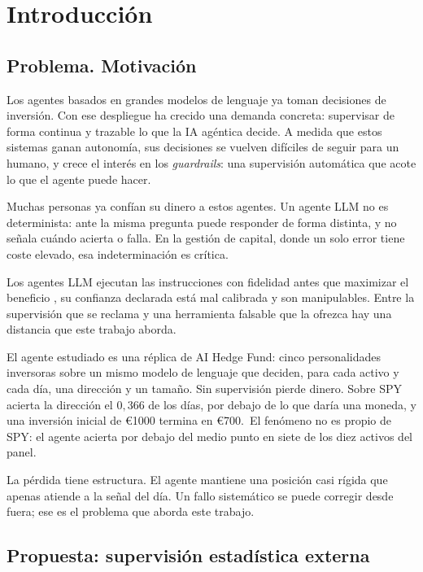 \chapter{Introducción}
\label{cap:introduccion}

\section{Problema. Motivación}
\label{sec:intro-motivacion}

Los agentes basados en grandes modelos de lenguaje ya toman decisiones de inversión. Con ese despliegue ha crecido una demanda concreta: supervisar de forma continua y trazable lo que la IA agéntica decide. A medida que estos sistemas ganan autonomía, sus decisiones se vuelven difíciles de seguir para un humano, y crece el interés en los \emph{guardrails}: una supervisión automática que acote lo que el agente puede hacer.

Muchas personas ya confían su dinero a estos agentes. Un agente LLM no es determinista: ante la misma pregunta puede responder de forma distinta, y no señala cuándo acierta o falla. En la gestión de capital, donde un solo error tiene coste elevado, esa indeterminación es crítica.

Los agentes LLM ejecutan las instrucciones con fidelidad antes que maximizar el beneficio \cite{lopezlira2025cantrade}, su confianza declarada está mal calibrada y son manipulables. Entre la supervisión que se reclama y una herramienta falsable que la ofrezca hay una distancia que este trabajo aborda.


El agente estudiado es una réplica de AI Hedge Fund: cinco personalidades inversoras sobre un mismo modelo de lenguaje que deciden, para cada activo y cada día, una dirección y un tamaño. Sin supervisión pierde dinero. Sobre SPY acierta la dirección el $0{,}366$ de los días, por debajo de lo que daría una moneda, y una inversión inicial de \euro{}1000 termina en \euro{}700.\,%
El fenómeno no es propio de SPY: el agente acierta por debajo del medio punto en siete de los diez activos del panel.\,%

La pérdida tiene estructura. El agente mantiene una posición casi rígida que apenas atiende a la señal del día. Un fallo sistemático se puede corregir desde fuera; ese es el problema que aborda este trabajo.

\section{Propuesta: supervisión estadística externa}
\label{sec:intro-idea}

